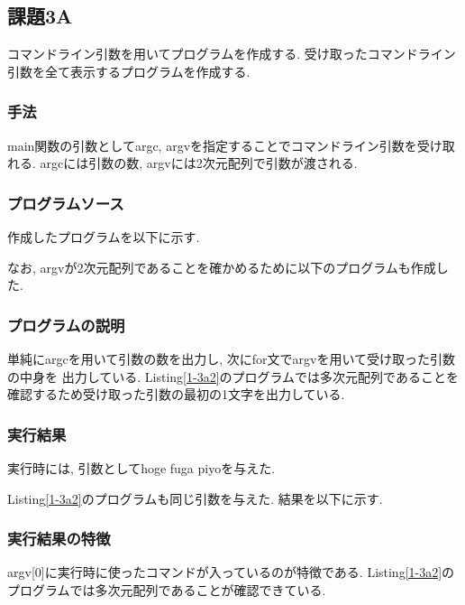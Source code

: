 \documentclass{jsarticle}
\begin{document}
        \subsection{課題3A}
            コマンドライン引数を用いてプログラムを作成する. 
            受け取ったコマンドライン引数を全て表示するプログラムを作成する. 
            \subsubsection{手法}
                main関数の引数としてargc, argvを指定することでコマンドライン引数を受け取れる. 
                argcには引数の数, argvには2次元配列で引数が渡される. 
            
            \subsubsection{プログラムソース}
                作成したプログラムを以下に示す. 
                

                なお, argvが2次元配列であることを確かめるために以下のプログラムも作成した. 
                
            \subsubsection{プログラムの説明}
                単純にargcを用いて引数の数を出力し, 次にfor文でargvを用いて受け取った引数の中身を
                出力している. 
                Listing\ref{1-3a2}のプログラムでは多次元配列であることを確認するため受け取った引数の最初の1文字を出力している. 
            
            \subsubsection{実行結果}
                実行時には, 引数としてhoge fuga piyoを与えた. 
                
                Listing\ref{1-3a2}のプログラムも同じ引数を与えた. 
                結果を以下に示す. 
                
                
            \subsubsection{実行結果の特徴}
                argv[0]に実行時に使ったコマンドが入っているのが特徴である. 
                Listing\ref{1-3a2}のプログラムでは多次元配列であることが確認できている. 
\end{document}
